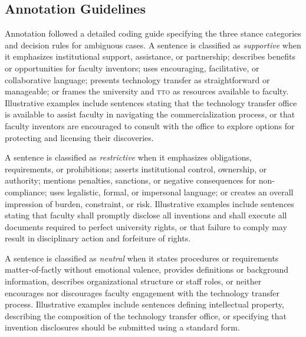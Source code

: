 \documentclass[12pt]{article}
\newcommand{\TTO}{\textsc{tto}}
\begin{document}
\newpage
\begin{appendices}
\renewcommand{\thesection}{\Alph{section}}
\setcounter{section}{0}

\section{Annotation Guidelines}
\label{app:annotation}

Annotation followed a detailed coding guide specifying the three stance categories and
decision rules for ambiguous cases.  A sentence is classified as \textit{supportive}
when it emphasizes institutional support, assistance, or partnership; describes benefits
or opportunities for faculty inventors; uses encouraging, facilitative, or collaborative
language; presents technology transfer as straightforward or manageable; or frames the
university and \TTO{} as resources available to faculty.  Illustrative examples include
sentences stating that the technology transfer office is available to assist faculty
in navigating the commercialization process, or that faculty inventors are encouraged
to consult with the office to explore options for protecting and licensing their
discoveries.

A sentence is classified as \textit{restrictive} when it emphasizes obligations,
requirements, or prohibitions; asserts institutional control, ownership, or authority;
mentions penalties, sanctions, or negative consequences for non-compliance; uses
legalistic, formal, or impersonal language; or creates an overall impression of burden,
constraint, or risk.  Illustrative examples include sentences stating that faculty
shall promptly disclose all inventions and shall execute all documents required to
perfect university rights, or that failure to comply may result in disciplinary action
and forfeiture of rights.

A sentence is classified as \textit{neutral} when it states procedures or requirements
matter-of-factly without emotional valence, provides definitions or background
information, describes organizational structure or staff roles, or neither encourages
nor discourages faculty engagement with the technology transfer process.  Illustrative
examples include sentences defining intellectual property, describing the composition
of the technology transfer office, or specifying that invention disclosures should be
submitted using a standard form.


\end{appendices}
\end{document}
